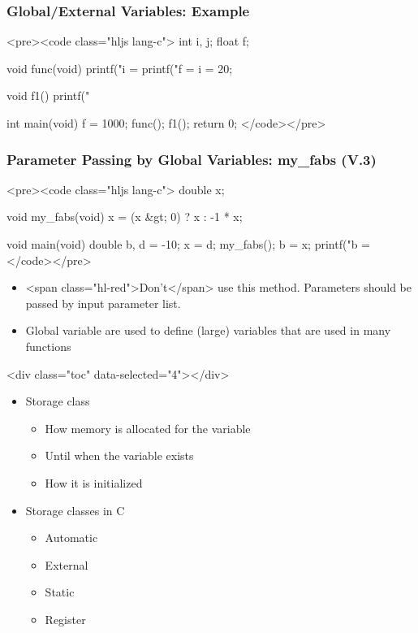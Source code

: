 \documentclass{../c-lecture}
\begin{document}
\begin{frame}
  \frametitle{Global/External Variables: Example}
  <pre><code class="hljs lang-c">
int i, j;
float f;

void func(void){
  printf("i = %
  printf("f = %
  i = 20;
}

void f1(){
  printf("%
}

int main(void){
  f = 1000;
  func();
  f1();
  return 0;
}
  </code></pre>
\end{frame}
\begin{frame}
  \begin{frame}
    \frametitle{Parameter Passing by Global Variables: my_fabs (V.3)}
    <pre><code class="hljs lang-c">
double x;

void my_fabs(void){
  x = (x &gt; 0) ? x : -1 * x;
}

void main(void){
  double b, d = -10;
  x = d;
  my_fabs();
  b = x;
  printf("b = %
}
    </code></pre>
  \end{frame}
  \begin{frame}
    \begin{itemize}
      \item
        <span class="hl-red">Don’t</span> use this method. Parameters should be
        passed by input parameter list.

      \item
        Global variable are used to define (large) variables that are used in
        many functions

    \end{itemize}
  \end{frame}
\end{frame}
\begin{frame}
  <div class="toc" data-selected="4"></div>
\end{frame}
\begin{frame}
  \begin{itemize}
    \item Storage class
    \begin{itemize}
      \item How memory is allocated for the variable
      \item Until when the variable exists
      \item How it is initialized
    \end{itemize}
    \item Storage classes in C
    \begin{itemize}
      \item Automatic
      \item External
      \item Static
      \item Register
    \end{itemize}
  \end{itemize}
\end{frame}
\end{document}
